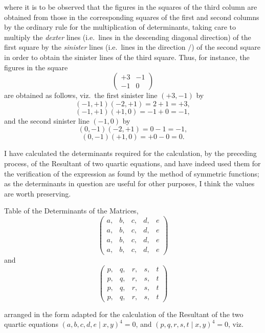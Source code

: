 \documentclass[11pt]{article}
\begin{document}
\medskip

\noindent where it is to be observed that the figures in the squares of the third column are obtained from those in the corresponding squares of the first and second columns by the ordinary rule for the multiplication of determinants, taking care to multiply the \emph{dexter} lines (i.e.\ lines in the descending diagonal direction) of the first square by the \emph{sinister} lines (i.e.\ lines in the direction $/$) of the second square in order to obtain the sinister lines of the third square. Thus, for instance, the figures in the square
\[
\begin{pmatrix} +3 & -1 \\ -1 & 0 \end{pmatrix}
\]
are obtained as follows, viz.\ the first sinister line $(+3, -1)$ by
\[
(-1, +1)(-2, +1) = 2 + 1 = +3,
\]
\[
(-1, +1)(+1, 0) = -1 + 0 = -1,
\]
and the second sinister line $(-1, 0)$ by
\[
(0, -1)(-2, +1) = 0 - 1 = -1,
\]
\[
(0, -1)(+1, 0) = +0 - 0 = 0.
\]

\medskip

\noindent I have calculated the determinants required for the calculation, by the preceding process, of the Resultant of two quartic equations, and have indeed used them for the verification of the expression as found by the method of symmetric functions; as the determinants in question are useful for other purposes, I think the values are worth preserving.

\medskip

\noindent Table of the Determinants of the Matrices,
\[
\begin{pmatrix} a, & b, & c, & d, & e \\ a, & b, & c, & d, & e \\ a, & b, & c, & d, & e \\ a, & b, & c, & d, & e \end{pmatrix}
\]
and
\[
\begin{pmatrix} p, & q, & r, & s, & t \\ p, & q, & r, & s, & t \\ p, & q, & r, & s, & t \\ p, & q, & r, & s, & t \end{pmatrix}
\]

\medskip

\noindent arranged in the form adapted for the calculation of the Resultant of the two quartic equations $(a, b, c, d, e \mid x, y)^4 = 0$, and $(p, q, r, s, t \mid x, y)^4 = 0$, viz.
\end{document}
